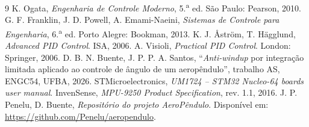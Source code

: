 \documentclass[a4paper,11pt]{article}
\newcommand{\repo}{\url{https://github.com/Penelu/aeropendulo}}
\begin{document}
\begin{thebibliography}{9}\small
{} K. Ogata, \textit{Engenharia de Controle Moderno}, 5.\textsuperscript{a} ed. São Paulo: Pearson, 2010.
 G. F. Franklin, J. D. Powell, A. Emami-Naeini, \textit{Sistemas de Controle para Engenharia}, 6.\textsuperscript{a} ed. Porto Alegre: Bookman, 2013.
 K. J. Åström, T. Hägglund, \textit{Advanced PID Control}. ISA, 2006.
 A. Visioli, \textit{Practical PID Control}. London: Springer, 2006.
 D. B. N. Buente, J. P. P. A. Santos, ``\textit{Anti-windup} por integração limitada aplicado ao controle de ângulo de um aeropêndulo'', trabalho AS, ENGC54, UFBA, 2026.
 STMicroelectronics, \textit{UM1724 -- STM32 Nucleo-64 boards user manual}.
 InvenSense, \textit{MPU-9250 Product Specification}, rev. 1.1, 2016.
 J. P. Penelu, D. Buente, \textit{Repositório do projeto AeroPêndulo}. Disponível em: \repo.
\end{thebibliography}
\end{document}
